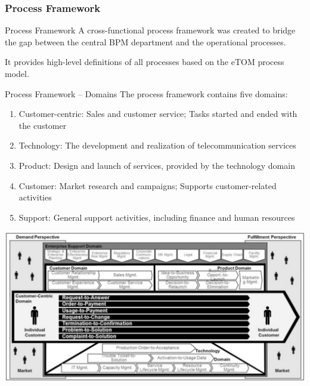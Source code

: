\documentclass{beamer}
\begin{document}
\subsubsection{Process Framework}
\begin{frame}{Process Framework}
    A cross-functional process framework was created to bridge the gap between the central BPM department and the operational processes.

    \vspace{1em}

    It provides high-level definitions of all processes based on the eTOM process model.
\end{frame}

\begin{frame}{Process Framework -- Domains}
    The process framework contains five domains:
    \begin{enumerate}[1.]
        \item Customer-centric: Sales and customer service; Tasks started and ended with the customer
        \item Technology: The development and realization of telecommunication services
        \item Product: Design and launch of services, provided by the technology domain
        \item Customer: Market research and campaigns; Supports customer-related activities
        \item Support: General support activities, including finance and human resources
    \end{enumerate}
\end{frame}

\begin{frame}
    \begin{center}
        \includegraphics[width=1.0\textwidth]{proj_procFramework.png}
    \end{center}
\end{frame}
\end{document}
